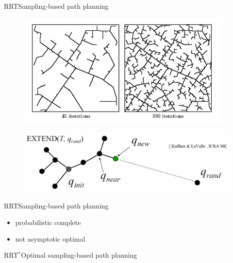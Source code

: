 \begin{frame}{RRT}{Sampling-based path planning}
	\begin{figure}
		\centering
		\includegraphics[width=.5\linewidth]{figure/RRT_graph1}
		\label{fig:rrt}
	\end{figure}
	\begin{figure}
		\centering
		\includegraphics[width=.9\linewidth]{figure/rrt_extend}
		\label{fig:rrt_extend}
	\end{figure}
\end{frame}

\begin{frame}{RRT}{Sampling-based path planning}
	\begin{itemize}
		\item probabilistic complete 
		\item not asymptotic optimal
	\end{itemize}
\end{frame}


\begin{frame}{RRT$^{*}$}{Optimal sampling-based path planning}
	
\end{frame}
